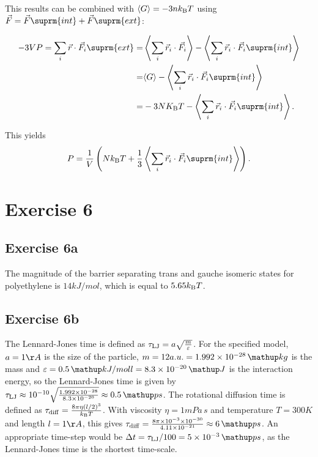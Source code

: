 \documentclass[titlepage]{report}
\begin{document}
This results can be combined with $ \langle G \rangle = -3 n k_{\rm{B}} T $ using $ \vec{F} = \vec{F}\suprm{int} + \vec{F}\suprm{ext} $:

\begin{subequations}
	\begin{align}
		-3 V P = \sum_i \vec{r} \cdot \vec{F}_i\suprm{ext} =& \left\langle \sum_i \vec{r}_i \cdot \vec{F}_i \right\rangle - \left\langle \sum_i \vec{r}_i \cdot \vec{F}_i\suprm{int} \right\rangle\\
		=& \langle G \rangle - \left\langle \sum_i \vec{r}_i \cdot \vec{F}_i\suprm{int} \right\rangle\\
		=& -3 N K\sub{B} T - \left\langle \sum_i \vec{r}_i \cdot \vec{F}_i\suprm{int} \right\rangle.
	\end{align}
\end{subequations}

This yields
\begin{equation}
P = \frac{1}{V} \left( N k\sub{B} T + \frac{1}{3} \left\langle \sum_i \vec{r}_i \cdot \vec{F}_i\suprm{int} \right\rangle \right).
\end{equation}

\section{Exercise 6}
\subsection{Exercise 6a}
The magnitude of the barrier separating trans and gauche isomeric states for polyethylene is $ 14 \unit{kJ / mol} $, which is equal to $ 5.65 k_{\rm{B}} T $.

\subsection{Exercise 6b}
The Lennard-Jones time is defined as $ \tau_{\rm{LJ}} = a\sqrt{\frac{m}{\varepsilon}} $.
For the specified model, $ a = 1 \AA $ is the size of the particle, $ m = 12 a.u. = 1.992 \E{-28} \unit{kg} $ is the mass and $ \varepsilon = 0.5 \unit{kJ / moll} = 8.3 \E{-20} \unit{J} $ is the interaction energy, so the Lennard-Jones time is given by $ \tau\sub{LJ} \approx 10^{-10} \sqrt{\frac{1.992 \E{-28}}{8.3 \E{-20}}} \approx 0.5 \unit{ps} $.
The rotational diffusion time is defined as $ \tau_{\rm{diff}} = \frac{8 \pi \eta (l/2)^3}{k_{\rm{B}} T} $.
With viscosity $ \eta = 1 \unit{mPa \, s} $ and temperature $ T = 300 \unit{K} $ and length $ l = 1 \AA $, this gives $ \tau\sub{diff} = \frac{8 \pi \E{-3} \E{-30}}{4.11\E{-21}} \approx 6\unit{ps} $.
An appropriate time-step would be $ \Delta t = \tau\sub{LJ} / 100 = 5 \E{-3} \unit{ps} $, as the Lennard-Jones time is the shortest time-scale. 
\end{document}

